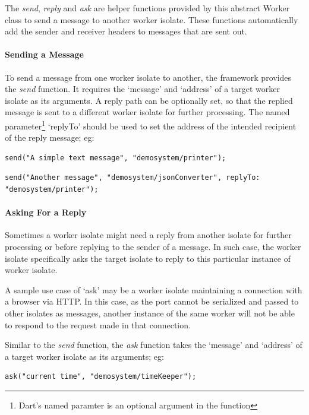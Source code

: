   The \emph{send}, \emph{reply} and \emph{ask} are helper functions provided by this abstract Worker class to send a message to another worker isolate. These functions automatically add the sender and receiver headers to messages that are sent out.

  \paragraph{Sending a Message}
  \label{para:sendMessage}
  To send a message from one worker isolate to another, the framework provides the \emph{send} function. It requires the ‘message’ and ‘address’ of a target worker isolate as its arguments. A reply path can be optionally set, so that the replied message is sent to a different worker isolate for further processing. The named parameter\footnote{Dart's named paramter is an optional argument in the function} ‘replyTo’ should be used to set the address of the intended recipient of the reply message; eg:
\begin{lstlisting}[numbers=none]
  send("A simple text message", "demosystem/printer");
\end{lstlisting}

\begin{lstlisting}[numbers=none]
  send("Another message", "demosystem/jsonConverter", replyTo: "demosystem/printer");
\end{lstlisting}

  \paragraph{Asking For a Reply}
  \label{subsec:askMessage}
  Sometimes a worker isolate might need a reply from another isolate for further processing or before replying to the sender of a message. In such case, the worker isolate specifically asks the target isolate to reply to this particular instance of worker isolate.

  A sample use case of ‘ask’ may be a worker isolate maintaining a connection with a browser via HTTP. In this case, as the port cannot be serialized and passed to other isolates as messages, another instance of the same worker will not be able to respond to the request made in that connection.

  Similar to the \emph{send} function, the \emph{ask} function takes the ‘message’ and ‘address’ of a target worker isolate as its arguments; eg:
\begin{lstlisting}[numbers=none]
  ask("current time", "demosystem/timeKeeper");
\end{lstlisting}
